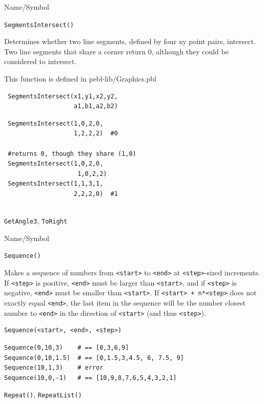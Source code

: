 \begin{desc}{Name/Symbol}
\item[Name/Symbol]   	\verb+SegmentsIntersect()+

\item[Description] Determines whether two line segments, defined by
  four xy point pairs, intersect. Two line segments that share a
  corner return 0, although they could be considered to intersect.

This function is defined in pebl-lib/Graphics.pbl

\item[Usage] 
\begin{verbatim}
 SegmentsIntersect(x1,y1,x2,y2, 
                   a1,b1,a2,b2)
\end{verbatim}

\item[Example]
\begin{verbatim}
 SegmentsIntersect(1,0,2,0, 
                   1,2,2,2)  #0

 #returns 0, though they share (1,0)
 SegmentsIntersect(1,0,2,0,
                    1,0,2,2)  
 SegmentsIntersect(1,1,3,1,
                   2,2,2,0)  #1


\end{verbatim}

\item[See Also]    	\verb+GetAngle3+, \verb+ToRight+
\end{desc}


\begin{desc}{Name/Symbol}
\item[Name/Symbol]   	\verb+Sequence()+

\item[Description] Makes a sequence of numbers from \verb+<start>+ to
  \verb+<end>+ at \verb+<step>+-sized increments. If \verb+<step>+ is
  positive, \verb+<end>+ must be larger than \verb+<start>+, and if
  \verb+<step>+ is negative, \verb+<end>+ must be smaller than
  \verb+<start>+. If \verb!<start> + n*<step>! does not exactly equal
  \verb+<end>+, the last item in the sequence will be the number
  closest number to \verb+<end>+ in the direction of \verb+<start>+
  (and thus \verb+<step>+).

\item[Usage] 
\begin{verbatim}
Sequence(<start>, <end>, <step>)
\end{verbatim}

\item[Example]
\begin{verbatim}
Sequence(0,10,3)    # == [0,3,6,9]
Sequence(0,10,1.5)  # == [0,1.5,3,4.5, 6, 7.5, 9]
Sequence(10,1,3)    # error
Sequence(10,0,-1)   # == [10,9,8,7,6,5,4,3,2,1]
\end{verbatim}

\item[See Also]    	\verb+Repeat()+, \verb+RepeatList()+
\end{desc}

